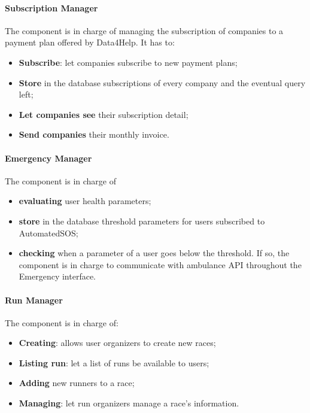 \paragraph{Subscription Manager} \mbox{} \newline
The component is in charge of managing the subscription of companies to a payment plan offered by Data4Help.
It has to:
\begin{itemize}
    \item \textbf{Subscribe}: let companies subscribe to new payment plans;
    \item \textbf{Store} in the database subscriptions of every company and the eventual query left;
    \item \textbf{Let companies see} their subscription detail;
    \item \textbf{Send companies} their monthly invoice.
\end{itemize}



\paragraph{Emergency Manager} 
\mbox{} \newline
The component is in charge of 
\begin{itemize}
    \item \textbf{evaluating} user health parameters;
    \item \textbf{store} in the database threshold parameters for users subscribed to AutomatedSOS;
    \item \textbf{checking} when a parameter of a user goes below the threshold. If so, the component is in charge to communicate with ambulance API throughout the Emergency interface.
\end{itemize}


\paragraph{Run Manager} \mbox{} \newline
The component is in charge of:
\begin{itemize}
    \item \textbf{Creating}: allows user organizers to create new races;
    \item \textbf{Listing run}: let a list of runs be available to users;
    \item \textbf{Adding} new runners to a race;
    \item \textbf{Managing}: let run organizers manage a race's information.
\end{itemize}


